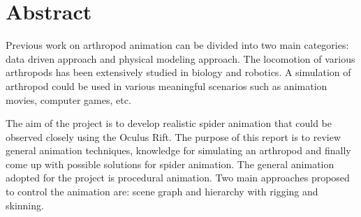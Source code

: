 \chapter*{\Large \center Abstract}
Previous work on arthropod animation can be divided into two main categories: data driven approach and physical modeling approach. The locomotion of various arthropods has been extensively studied in biology and robotics. A simulation of arthropod could be used in various meaningful scenarios such as animation movies, computer games, etc.



The aim of the project is to develop realistic spider animation that could be observed closely using the Oculus Rift. The purpose of this report is to review general animation techniques, knowledge for simulating an arthropod and finally come up with possible solutions for spider animation. The general animation adopted for the project is procedural animation. Two main approaches proposed to control the animation are: scene graph and hierarchy with rigging and skinning.


